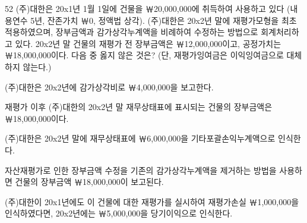 \begin{question}{52}
(주)대한은 20x1년 1월 1일에 건물을 ￦20,000,000에 취득하여 사용하고 있다 (내용연수 5년, 잔존가치 ￦0, 정액법 상각). (주)대한은 20x2년 말에 재평가모형을 최초 적용하였으며, 장부금액과 감가상각누계액을 비례하여 수정하는 방법으로 회계처리하고 있다. 20x2년 말 건물의 재평가 전 장부금액은 ￦12,000,000이고, 공정가치는 ￦18,000,000이다. 다음 중 옳지 않은 것은? (단, 재평가잉여금은 이익잉여금으로 대체하지 않는다.)
\begin{choices}
  \item (주)대한은 20x2년에 감가상각비로 ￦4,000,000을 보고한다.
  \item 재평가 이후 (주)대한의 20x2년 말 재무상태표에 표시되는 건물의 장부금액은 ￦18,000,000이다.
  \item (주)대한은 20x2년 말에 재무상태표에 ￦6,000,000을 기타포괄손익누계액으로 인식한다.
  \item 자산재평가로 인한 장부금액 수정을 기존의 감가상각누계액을 제거하는 방법을 사용하면 건물의 장부금액 ￦18,000,000이 보고된다.
  \item (주)대한이 20x1년에도 이 건물에 대한 재평가를 실시하여 재평가손실 ￦1,000,000을 인식하였다면, 20x2년에는 ￦5,000,000을 당기이익으로 인식한다.
\end{choices}
\end{question}

